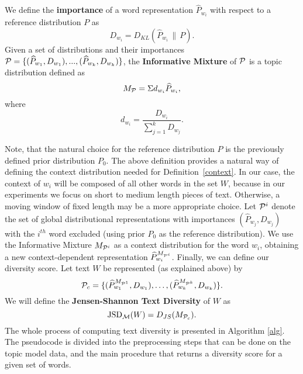 \bed\label{mixture}
We define the {\bf importance} of a word representation $\widehat{P}_{w_i}$ with
respect to a reference distribution $P$ as 
\[D_{w_i}=D_{KL}(\widehat{P}_{w_i}\,\|\,P).\]
Given a set of distributions and their importances ${\mathcal P} =
\{(\widehat{P}_{w_1},D_{w_1}),...,(\widehat{P}_{w_k},D_{w_k})\}$, the
{\bf Informative Mixture} of ${\mathcal P}$ is a topic distribution defined as 
\[M_{{\mathcal P}} = \Sigma d_{w_i} \widehat{P}_{w_i},\]
where
\[d_{w_i} = \frac{D_{w_i}}{\sum_{j=1}^k D_{w_j}}.\]
\eed

Note, that the natural choice for the reference distribution $P$ is
the previously defined prior distribution $P_0$.
The above definition provides a natural way of defining the context
distribution needed for Definition~\ref{context}. 
In our case, the context of $w_i$ will be composed of
all other words in the set $W$, because in our experiments we
focus on short to medium length pieces of text. Otherwise, a moving
window of fixed length may be a more appropriate choice. Let
${\mathcal P}^i$ denote the set of global distributional representations
with importances $(\widehat{P}_{w_j},D_{w_j})$ with the $i^{th}$ word
excluded (using prior $P_0$ as the reference
distribution). We use the Informative Mixture 
$M_{{\mathcal P}^i}$ as a context distribution for the word 
$w_i$, obtaining a new context-dependent representation
$\widehat{P}^{M_{{\mathcal P}^i}}_{w_i}$. Finally, we can define our diversity
score.
\bed\label{text-diversity}
 Let text $W$ be represented (as explained above) by
\[{\mathcal P}_c=\{(\widehat{P}^{M_{{\mathcal P}^1}}_{w_1},D_{w_1}),\dots,
(\widehat{P}^{M_{{\mathcal P}^k}}_{w_k},D_{w_k})\}.\] 
We will define the
{\bf Jensen-Shannon Text Diversity} of $W$ as
\[\textrm{JSD}_{\mathcal M}(W) = D_{JS}(M_{{\mathcal P}_c}).\]
\eed
The whole process of computing text diversity is
presented in Algorithm \ref{alg}. The pseudocode is divided into the
preprocessing steps that can be done on the topic model data, and the
main procedure that returns a diversity score for a given set of words.

